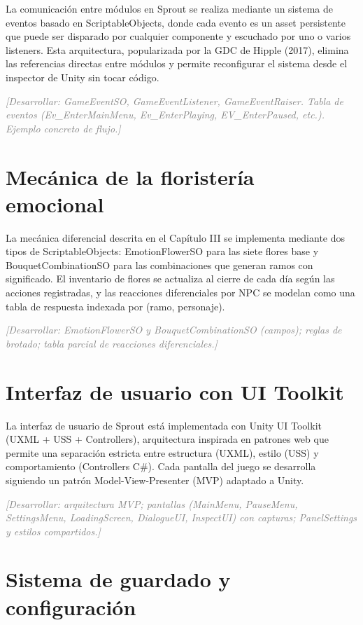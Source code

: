 \documentclass[12pt,twoside,titlepage]{report}
\begin{document}
La comunicación entre módulos en Sprout se realiza mediante un sistema de eventos basado en ScriptableObjects, donde cada evento es un asset persistente que puede ser disparado por cualquier componente y escuchado por uno o varios listeners. Esta arquitectura, popularizada por la GDC de Hipple (2017), elimina las referencias directas entre módulos y permite reconfigurar el sistema desde el inspector de Unity sin tocar código.

\textcolor{gray}{\textit{[Desarrollar: GameEventSO, GameEventListener, GameEventRaiser. Tabla de eventos (Ev\_EnterMainMenu, Ev\_EnterPlaying, EV\_EnterPaused, etc.). Ejemplo concreto de flujo.]}}

\section{Mecánica de la floristería emocional}

La mecánica diferencial descrita en el Capítulo III se implementa mediante dos tipos de ScriptableObjects: EmotionFlowerSO para las siete flores base y BouquetCombinationSO para las combinaciones que generan ramos con significado. El inventario de flores se actualiza al cierre de cada día según las acciones registradas, y las reacciones diferenciales por NPC se modelan como una tabla de respuesta indexada por (ramo, personaje).

\textcolor{gray}{\textit{[Desarrollar: EmotionFlowerSO y BouquetCombinationSO (campos); reglas de brotado; tabla parcial de reacciones diferenciales.]}}

\section{Interfaz de usuario con UI Toolkit}

La interfaz de usuario de Sprout está implementada con Unity UI Toolkit (UXML + USS + Controllers), arquitectura inspirada en patrones web que permite una separación estricta entre estructura (UXML), estilo (USS) y comportamiento (Controllers C\#). Cada pantalla del juego se desarrolla siguiendo un patrón Model-View-Presenter (MVP) adaptado a Unity.

\textcolor{gray}{\textit{[Desarrollar: arquitectura MVP; pantallas (MainMenu, PauseMenu, SettingsMenu, LoadingScreen, DialogueUI, InspectUI) con capturas; PanelSettings y estilos compartidos.]}}

\section{Sistema de guardado y configuración}
\end{document}
